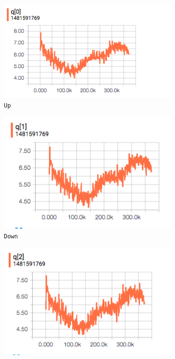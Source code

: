 \documentclass[12pt]{article}
\begin{document}
\begin{figure}[H]
  \begin{subfigure}{0.19\textwidth}
    \includegraphics[width=1\textwidth]{report/TG2D-H_action_q/q0}
    \caption*{\texttt{Up}}
    \centering
  \end{subfigure}
  \begin{subfigure}{0.19\textwidth}
    \includegraphics[width=1\textwidth]{report/TG2D-H_action_q/q1}
    \caption*{\texttt{Down}}
    \centering
  \end{subfigure}
  \begin{subfigure}{0.19\textwidth}
    \includegraphics[width=1\textwidth]{report/TG2D-H_action_q/q2}

\end{subfigure}
\end{figure}
\end{document}
